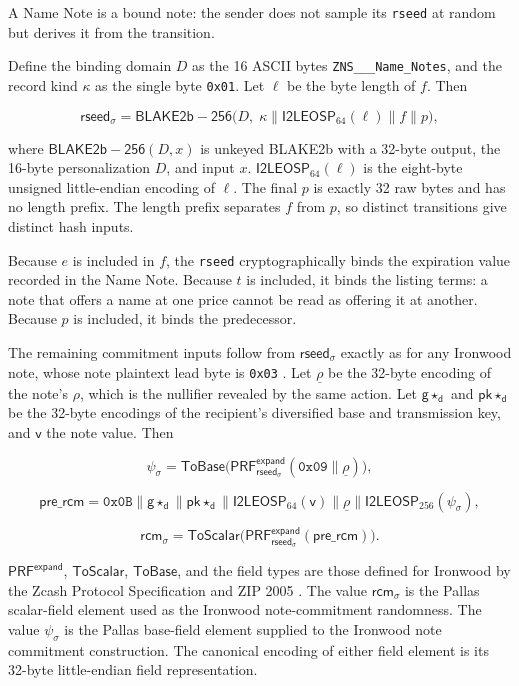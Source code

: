 A Name Note is a bound note: the sender does not sample its \texttt{rseed} at random but derives it from the transition.

Define the binding domain $D$ as the 16 ASCII bytes \texttt{ZNS\_\_\_Name\_Notes}, and the record kind $\kappa$ as the single byte \texttt{0x01}. Let $\ell$ be the byte length of $f$. Then

$$\mathsf{rseed}_\sigma = \mathsf{BLAKE2b{-}256}\big(D,\; \kappa \parallel \mathsf{I2LEOSP}_{64}(\ell) \parallel f \parallel p\big),$$

where $\mathsf{BLAKE2b{-}256}(D, x)$ is unkeyed BLAKE2b with a 32-byte output, the 16-byte personalization $D$, and input $x$. $\mathsf{I2LEOSP}_{64}(\ell)$ is the eight-byte unsigned little-endian encoding of $\ell$. The final $p$ is exactly 32 raw bytes and has no length prefix. The length prefix separates $f$ from $p$, so distinct transitions give distinct hash inputs.

Because $e$ is included in $f$, the \texttt{rseed} cryptographically binds the expiration value recorded in the Name Note. Because $t$ is included, it binds the listing terms: a note that offers a name at one price cannot be read as offering it at another. Because $p$ is included, it binds the predecessor.

The remaining commitment inputs follow from $\mathsf{rseed}_\sigma$ exactly as for any Ironwood note, whose note plaintext lead byte is \texttt{0x03} \cite{zip2005}. Let $\underline{\rho}$ be the 32-byte encoding of the note's $\rho$, which is the nullifier revealed by the same action. Let $\mathsf{g}\star_{\mathsf{d}}$ and $\mathsf{pk}\star_{\mathsf{d}}$ be the 32-byte encodings of the recipient's diversified base and transmission key, and $\mathsf{v}$ the note value. Then

$$\psi_\sigma = \mathsf{ToBase}\big(\mathsf{PRF^{expand}_{rseed_\sigma}}(\mathtt{0x09} \parallel \underline{\rho})\big),$$

$$\mathsf{pre\_rcm} = \mathtt{0x0B} \parallel \mathsf{g}\star_{\mathsf{d}} \parallel \mathsf{pk}\star_{\mathsf{d}} \parallel \mathsf{I2LEOSP}_{64}(\mathsf{v}) \parallel \underline{\rho} \parallel \mathsf{I2LEOSP}_{256}(\psi_\sigma),$$

$$\mathsf{rcm}_\sigma = \mathsf{ToScalar}\big(\mathsf{PRF^{expand}_{rseed_\sigma}}(\mathsf{pre\_rcm})\big).$$

$\mathsf{PRF^{expand}}$, $\mathsf{ToScalar}$, $\mathsf{ToBase}$, and the field types are those defined for Ironwood by the Zcash Protocol Specification and ZIP 2005 \cite{zcash-protocol,zip224,zip2005}. The value $\mathsf{rcm}_\sigma$ is the Pallas scalar-field element used as the Ironwood note-commitment randomness. The value $\psi_\sigma$ is the Pallas base-field element supplied to the Ironwood note commitment construction. The canonical encoding of either field element is its 32-byte little-endian field representation.

